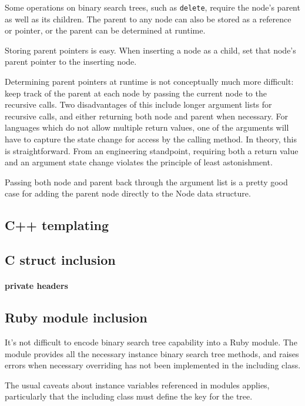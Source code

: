 \documentclass{article}
\begin{document}
Some operations on binary search trees, such as {\tt delete}, require
the node's parent as well as its children. The parent to any node can also
be stored as a reference or pointer, or the parent can be determined at
runtime.

Storing parent pointers is easy. When inserting a node as a child, set that
node's parent pointer to the inserting node.

Determining parent pointers at runtime is not conceptually much more difficult:
keep track of the parent at each node by passing the current node to the
recursive calls. Two disadvantages of this include longer argument lists
for recursive calls, and either returning both node and parent when necessary.
For languages which do not allow multiple return values, one of the arguments
will have to capture the state change for access by the calling method.
In theory, this is straightforward. From an engineering standpoint, requiring
both a return value and an argument state change violates the principle of
least astonishment.

Passing both node and parent back through the argument list is a pretty good
case for adding the parent node directly to the Node data structure.


\subsection{C++ templating}

\subsection{C struct inclusion}

\paragraph{private headers}

\subsection{Ruby module inclusion}

It's not difficult to encode binary search tree capability into a Ruby module.
The module provides all the necessary instance binary search tree methods, and
raises errors when necessary overriding has not been implemented in the
including class.

The usual caveats about instance variables referenced in modules applies,
particularly that the including class must define the key for the tree.
\end{document}
